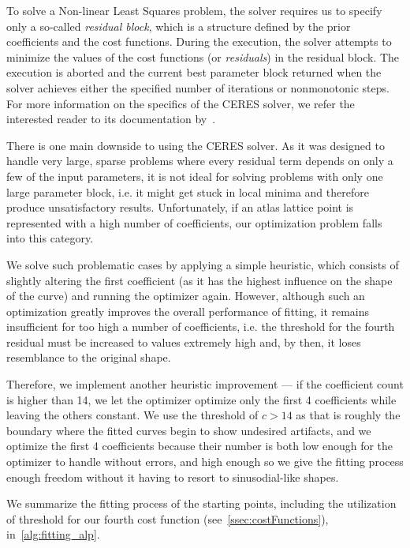 To solve a Non-linear Least Squares problem, the solver requires us to specify only a so-called \emph{residual block}, which is a structure defined by the prior coefficients and the cost functions. During the execution, the solver attempts to minimize the values of the cost functions (or \emph{residuals}) in the residual block. The execution is aborted and the current best parameter block returned when the solver achieves either the specified number of iterations or nonmonotonic steps. For more information on the specifics of the CERES solver, we refer the interested reader to its documentation by~\citet{ceresNonLinearLeastSquares}.

There is one main downside to using the CERES solver. As it was designed to handle very large, sparse problems where every residual term depends on only a few of the input parameters, it is not ideal for solving problems with only one large parameter block, i.e. it might get stuck in local minima and therefore produce unsatisfactory results. Unfortunately, if an atlas lattice point is represented with a high number of coefficients, our optimization problem falls into this category.

We solve such problematic cases by applying a simple heuristic, which consists of slightly altering the first coefficient (as it has the highest influence on the shape of the curve) and running the optimizer again. However, although such an optimization greatly improves the overall performance of fitting, it remains insufficient for too high a number of coefficients, i.e. the threshold for the fourth residual must be increased to values extremely high and, by then, it loses resemblance to the original shape.

Therefore, we implement another heuristic improvement --- if the coefficient count is higher than 14, we let the optimizer optimize only the first 4 coefficients while leaving the others constant. We use the threshold of $c > 14$ as that is roughly the boundary where the fitted curves begin to show undesired artifacts, and we optimize the first 4 coefficients because their number is both low enough for the optimizer to handle without errors, and high enough so we give the fitting process enough freedom without it having to resort to sinusodial-like shapes.

We summarize the fitting process of the starting points, including the utilization of threshold for our fourth cost function (see~\cref{ssec:costFunctions}), in~\cref{alg:fitting_alp}.

